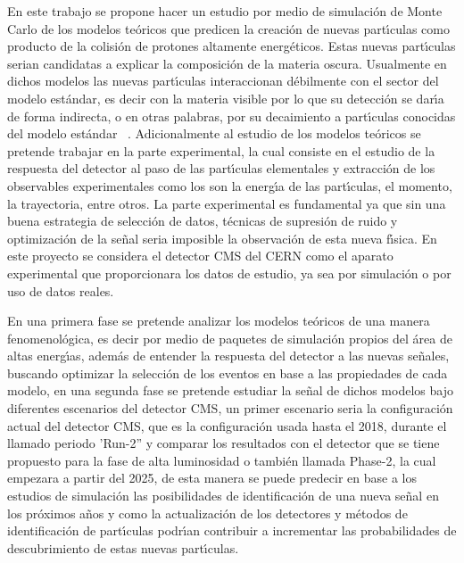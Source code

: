 En este trabajo se propone hacer un estudio por medio de simulaci\'on de Monte Carlo de los modelos te\'oricos que predicen la creaci\'on de nuevas part\'{\i}culas como producto de la colisi\'on de protones altamente energ\'eticos. Estas nuevas part\'{\i}culas serian candidatas a explicar la composici\'on de la materia oscura.  Usualmente en dichos modelos las nuevas part\'{\i}culas interaccionan d\'ebilmente con el sector del modelo est\'andar, es decir con la materia visible por lo que su detecci\'on se dar\'{\i}a de forma indirecta, o en otras palabras, por su decaimiento a part\'{\i}culas conocidas del modelo est\'andar~\cite{Curtin2015} .  Adicionalmente al estudio de los modelos te\'oricos se pretende trabajar en la parte experimental, la cual consiste en el estudio de la respuesta del detector al paso de las part\'{\i}culas elementales y extracci\'on de los observables experimentales como los son la energ\'{\i}a de las part\'{\i}culas, el momento, la trayectoria, entre otros.  La parte experimental es fundamental ya que sin una buena estrategia de selecci\'on de datos, t\'ecnicas de supresi\'on de ruido y optimizaci\'on de la se\~nal seria imposible la observaci\'on de esta nueva f\'{\i}sica. En este proyecto se considera el detector CMS del CERN como el aparato experimental que proporcionara los datos de estudio, ya sea por simulaci\'on o por uso de datos reales.  

En una primera fase se pretende analizar los modelos te\'oricos de una manera fenomenol\'ogica, es decir por medio de paquetes de simulaci\'on propios del \'area de altas energ\'{\i}as, adem\'as de entender la respuesta del detector a las nuevas se\~nales, buscando optimizar la selecci\'on de los eventos en base a las propiedades de cada modelo, en una segunda fase se pretende estudiar la se\~nal de dichos modelos bajo diferentes escenarios del detector CMS, un primer escenario seria la configuraci\'on actual del detector CMS, que es la configuraci\'on usada hasta el 2018, durante el llamado periodo 'Run-2'' y comparar los resultados con el detector que se tiene propuesto para la fase de alta luminosidad o tambi\'en llamada Phase-2, la cual empezara  a partir del 2025, de esta manera se puede predecir en base a los estudios de simulaci\'on las posibilidades de identificaci\'on de una nueva se\~nal en los pr\'oximos a\~nos y como la actualizaci\'on de los detectores y m\'etodos de identificaci\'on de part\'{\i}culas podr\'{\i}an contribuir a incrementar las probabilidades de descubrimiento de estas nuevas part\'{\i}culas. 


